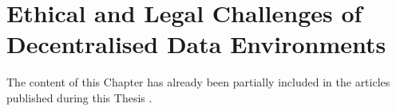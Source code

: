 \chapter{Ethical and Legal Challenges of Decentralised Data Environments}
\label{chap:legal}

\begin{tcolorbox}[colback=royallavender!40]
The content of this Chapter has already been partially included in the articles published during this Thesis \citep{esteves_fostering_2022,asgarinia_who_2023,florea_is_2023}.
\end{tcolorbox}




